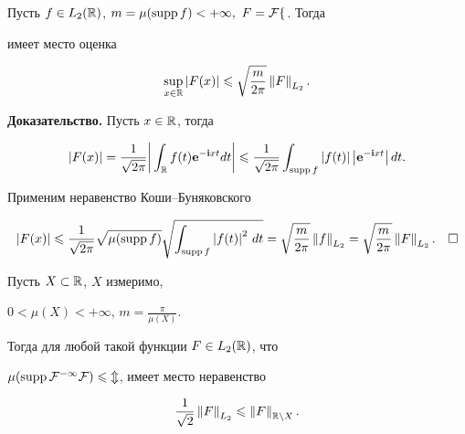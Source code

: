 \begin{thms} \label{th:41}


Пусть $f\in L_{2}(\Bbb R)$, $m=\mu(\operatorname{supp} f)<+\infty,\ F=\cal F f$. Тогда 


имеет место оценка


$$


\sup\limits_{x\in\Bbb R}\abs{F(x)}\leqslant


\sqrt{\frac{m}{2\pi}}\norm{F}_{\Ltwo}.


$$


\end{thms}








{\bf Доказательство.} Пусть $x\in\Bbb R$, тогда


$$


\abs{F(x)}=


\frac{1}{\sqrt{2\pi}}\bigg|\int_{\Bbb R}f(t)\bold e^{-\bold i xt}dt\bigg|


\leqslant


\frac{1}{\sqrt{2\pi}}\int_{\supp f}\abs{f(t)}\abs{\bold e^{-\bold i xt}}dt.


$$


Применим неравенство Коши--Буняковского


$$


\abs{F(x)}\leqslant


\frac{1}{\sqrt{2\pi}}\sqrt{\mu(\supp f)}


\sqrt{\int_{\supp f}\abs{f(t)}^{2}\,dt}=


\sqrt{\frac{m}{2\pi}}\norm{f}_{\Ltwo}=


\sqrt{\frac{m}{2\pi}}\norm{F}_{\Ltwo}.\quad\square


$$








\begin{thms} \label{th:42}


Пусть $X\subset\Bbb R$, $X$ измеримо,


$0<\mu(X)<+\infty$, $m=\frac{\pi}{\mu(X)}$.


Тогда для любой такой функции $F\in L_{2}(\Bbb R)$, что


$\mu (\operatorname{supp} \cal F^{-1}F )\leqslant m$, имеет место неравенство


$$


\frac{1}{\sqrt{2}}\norm{F}_{\Ltwo} \leqslant


\norm{F}_{\Bbb R\setminus X}.


$$


\end{thms}








